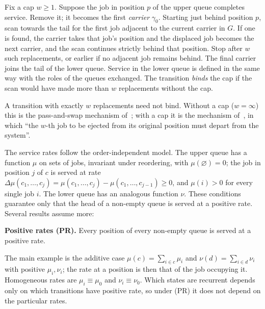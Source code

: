 \documentclass[11pt,a4paper]{article}
\theoremstyle{plain}
\theoremstyle{plain}
\newcommand{\empt}{\varnothing}
\begin{document}
\begin{definition}\label{def:transition}
Fix a cap $w\ge1$. Suppose the job in position $p$ of the upper queue completes service. Remove it; it becomes the first \emph{carrier} $\gamma_0$. Starting just behind position $p$, scan towards the tail for the first job adjacent to the current carrier in $G$. If one is found, the carrier takes that job's position and the displaced job becomes the next carrier, and the scan continues strictly behind that position. Stop after $w$ such replacements, or earlier if no adjacent job remains behind. The final carrier joins the tail of the lower queue. Service in the lower queue is defined in the same way with the roles of the queues exchanged. The transition \emph{binds} the cap if the scan would have made more than $w$ replacements without the cap.
\end{definition}

A transition with exactly $w$ replacements need not bind. Without a cap ($w=\infty$) this is the pass-and-swap mechanism of~\cite{CD2021}; with a cap it is the mechanism of~\cite[Section~5]{DG2024}, in which ``the $w$-th job to be ejected from its original position must depart from the system''.

The service rates follow the order-independent model. The upper queue has a function $\mu$ on sets of jobs, invariant under reordering, with $\mu(\empt)=0$; the job in position $j$ of $c$ is served at rate $\Delta\mu(c_1,\dots,c_j)=\mu(c_1,\dots,c_j)-\mu(c_1,\dots,c_{j-1})\ge0$, and $\mu(i)>0$ for every single job $i$. The lower queue has an analogous function $\nu$. These conditions guarantee only that the head of a non-empty queue is served at a positive rate. Several results assume more:

\smallskip
\noindent\textbf{Positive rates (PR).} Every position of every non-empty queue is served at a positive rate.
\smallskip

\noindent The main example is the additive case $\mu(c)=\sum_{i\in c}\mu_i$ and $\nu(d)=\sum_{i\in d}\nu_i$ with positive $\mu_i,\nu_i$; the rate at a position is then that of the job occupying it. Homogeneous rates are $\mu_i\equiv\mu_0$ and $\nu_i\equiv\nu_0$. Which states are recurrent depends only on which transitions have positive rate, so under (PR) it does not depend on the particular rates.
\end{document}

